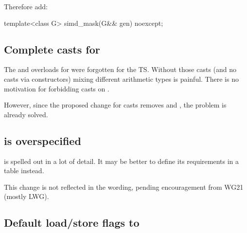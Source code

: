 Therefore add:
\begin{wgText}
\begin{itemdecl}
template<class G> simd_mask(G&& gen) noexcept;
\end{itemdecl}
\end{wgText}

\subsection{Complete casts for }
The  and  overloads for  were forgotten for the TS.
Without those casts (and no casts via constructors) mixing different arithmetic types is painful.
There is no motivation for forbidding casts on .

However, since the proposed change for casts removes  and
, the problem is already solved.


\subsection{ is overspecified}
 is spelled out in a lot of detail.
It may be better to define its requirements in a table instead.

This change is not reflected in the wording, pending encouragement from WG21 (mostly LWG).

\subsection{Default load/store flags to }

